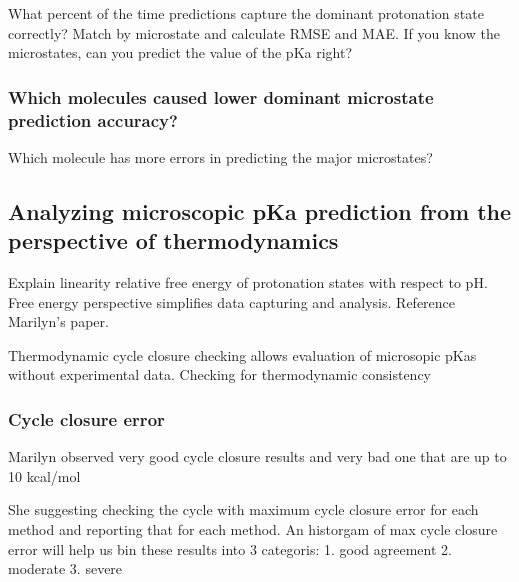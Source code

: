 \documentclass[9pt,lineno,final]{elife}
\begin{document}
What percent of the time predictions capture the dominant protonation state correctly? 
Match by microstate and calculate RMSE and MAE. If you know the microstates, can you predict the value of the pKa right? 




\subsubsection{Which molecules caused lower dominant microstate prediction accuracy?}

Which molecule has more errors in predicting the major microstates?









\subsection{Analyzing microscopic pKa prediction from the perspective of thermodynamics}
Explain  linearity  relative free energy of protonation states with respect to pH. Free energy perspective simplifies data capturing and analysis. Reference Marilyn's paper.

Thermodynamic cycle closure checking allows evaluation of microsopic pKas  without experimental data.
Checking for thermodynamic consistency


\subsubsection{Cycle closure error}

Marilyn observed very good cycle closure results and very bad one that are up to 10 kcal/mol
 
She suggesting checking the cycle with maximum cycle closure error for each method and reporting that for each method.
An historgam of max cycle closure error will help us bin these results into 3 categoris:
1. good agreement
2. moderate
3. severe 
 
\end{document}
